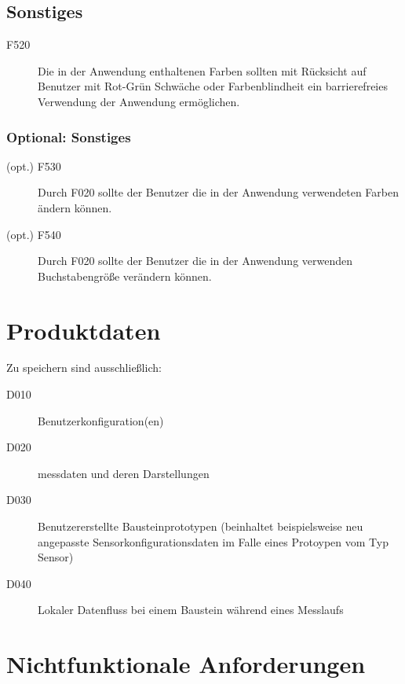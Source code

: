 \documentclass[parskip=full]{scrartcl}
\begin{document}
\subsection{Sonstiges}


\begin{description}

\item[F520] Die in der Anwendung enthaltenen Farben sollten mit Rücksicht auf Benutzer mit Rot-Grün Schwäche oder Farbenblindheit ein barrierefreies Verwendung der Anwendung ermöglichen.

\end{description}

\subsubsection{Optional: Sonstiges}

\begin{description}

\item[(opt.) F530] Durch F020 sollte der Benutzer die in der Anwendung verwendeten Farben ändern können.
\item[(opt.) F540] Durch F020 sollte der Benutzer die in der Anwendung verwenden Buchstabengröße verändern können.

\end{description}

\clearpage
\section{Produktdaten}\label{produktdaten}

Zu speichern sind ausschließlich:

\begin{description}

\item[D010] \gls{Benutzerkonfiguration}(en)
\item[D020] \gls{messdaten} und deren Darstellungen
\item[D030] Benutzererstellte Bausteinprototypen (beinhaltet beispielsweise neu angepasste Sensorkonfigurationsdaten im Falle eines Protoypen vom Typ Sensor)
\item[D040] Lokaler Datenfluss bei einem Baustein während eines Messlaufs 

\end{description}

\clearpage
\section{Nichtfunktionale Anforderungen}\label{nichtfunktionale}
\end{document}
